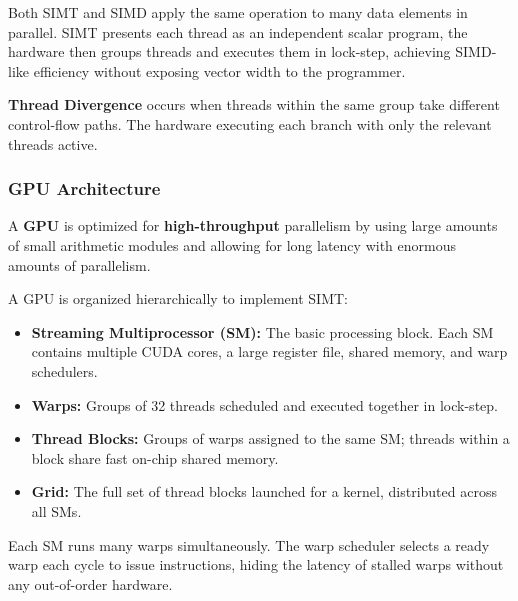 \begin{remark}
    Both SIMT and SIMD apply the same operation to many data elements in parallel. SIMT presents each thread as an independent scalar program, the hardware then groups threads and executes them in lock-step, achieving SIMD-like efficiency without exposing vector width to the programmer.
\end{remark}

\begin{definition}
    \textbf{Thread Divergence} occurs when threads within the same group take different control-flow paths. The hardware executing each branch with only the relevant threads active. 
\end{definition}


\subsubsection{GPU Architecture}

\begin{definition}
    A \textbf{GPU} is optimized for \textbf{high-throughput} parallelism by using large amounts of small arithmetic modules and allowing for long latency with enormous amounts of parallelism.
\end{definition}

\begin{definition}
    A GPU is organized hierarchically to implement SIMT:
    \begin{itemize}
        \item \textbf{Streaming Multiprocessor (SM):} The basic processing block. Each SM contains multiple CUDA cores, a large register file, shared memory, and warp schedulers.
        \item \textbf{Warps:} Groups of 32 threads scheduled and executed together in lock-step.
        \item \textbf{Thread Blocks:} Groups of warps assigned to the same SM; threads within a block share fast on-chip shared memory.
        \item \textbf{Grid:} The full set of thread blocks launched for a kernel, distributed across all SMs.
    \end{itemize}
\end{definition}

\begin{remark}
    Each SM runs many warps simultaneously. The warp scheduler selects a ready warp each cycle to issue instructions, hiding the latency of stalled warps without any out-of-order hardware.
\end{remark}

